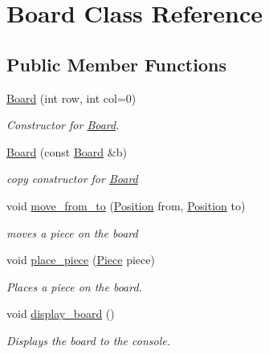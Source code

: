 \hypertarget{class_board}{}\section{Board Class Reference}
\label{class_board}
\subsection*{Public Member Functions}
\begin{DoxyCompactItemize}
\item 
\hyperlink{class_board_a3ac4a0188fb538b543c0297b4d4b80f9}{Board} (int row, int col=0)
\begin{DoxyCompactList}\small\item\em Constructor for \hyperlink{class_board}{Board}. \end{DoxyCompactList}\item 
\hyperlink{class_board_ac77f209904bb37545295c17649a9dc17}{Board} (const \hyperlink{class_board}{Board} \&b)
\begin{DoxyCompactList}\small\item\em copy constructor for \hyperlink{class_board}{Board} \end{DoxyCompactList}\item 
void \hyperlink{class_board_a80a65ba64e71692a98908462b83c7225}{move\+\_\+from\+\_\+to} (\hyperlink{struct_position}{Position} from, \hyperlink{struct_position}{Position} to)
\begin{DoxyCompactList}\small\item\em moves a piece on the board \end{DoxyCompactList}\item 
void \hyperlink{class_board_a84451a19dbe1741f08404a41b4394f76}{place\+\_\+piece} (\hyperlink{class_piece}{Piece} piece)
\begin{DoxyCompactList}\small\item\em Places a piece on the board. \end{DoxyCompactList}\item 
\mbox{\label{class_board_a5937bd1d9eee4d11feeb6acc39228983}} 
void \hyperlink{class_board_a5937bd1d9eee4d11feeb6acc39228983}{display\+\_\+board} ()
\begin{DoxyCompactList}\small\item\em Displays the board to the console. \end{DoxyCompactList}\item 
\mbox{\label{class_board_ab44c78159172094685eb9a75ca2cf91e}} 

\end{DoxyCompactItemize}
